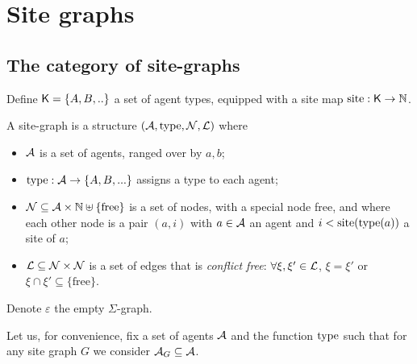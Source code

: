 \section{Site graphs}

\subsection{The category of site-graphs}

Define $\mathsf{K} = \{A, B,..\}$ a set of agent types, equipped with a site map $\operatorname{site}:\mathsf{K}\to\mathbb{N}$.

\begin{definition}
\label{def:site_graphs}
A site-graph is a structure $(\mathcal{A},\operatorname{type},\mathcal{N},\mathcal{L})$ where
\begin{itemize}
\item $\mathcal{A}$ is a set of agents, ranged over by $a,b$;
\item $\operatorname{type}:\mathcal{A}\to \{A, B,...\}$ assigns a type to each agent;
\item $\mathcal{N}\subseteq \mathcal{A}\times\mathbb{N}\uplus\{\text{free}\}$ is a set of nodes, with a special node free, and where each other node is a pair $(a,i)$ with $a\in\mathcal{A}$ an agent and $i<\operatorname{site}(\operatorname{type}(a))$ a site of $a$;
\item $\mathcal{L}\subseteq \mathcal{N}\times\mathcal{N}$ is a set of edges that is \emph{conflict free}: $\forall \xi,\xi'\in\mathcal{L}$, $\xi=\xi'$ or $\xi\cap \xi' \subseteq \{\text{free}\}$.
\end{itemize}
Denote $\varepsilon$ the empty $\Sigma$-graph.
\end{definition}

Let us, for convenience, fix a set of agents $\mathcal{A}$ and the function $\operatorname{type}$ such that for any site graph $G$ we consider $\mathcal{A}_G\subseteq \mathcal{A}$.

